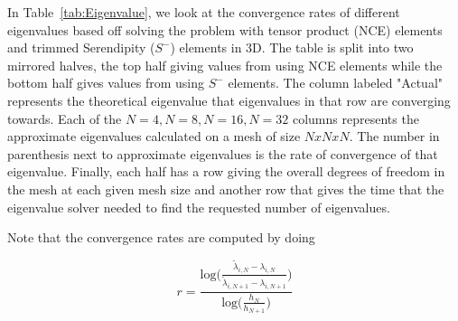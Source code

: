 \documentclass[manuscript,screen]{acmart}
\newcommand{\akg}[1]{\textcolor{blue}{\textbf{AG:} #1}}
\begin{document}

\noindent In Table~\ref{tab:Eigenvalue}, we look at the convergence rates of different eigenvalues based off solving the problem with tensor product (NCE) elements and trimmed Serendipity ($S^-$) elements in 3D.  The table is split into two mirrored halves, the top half giving values from using NCE elements while the bottom half gives values from using $S^-$ elements.  The column labeled "Actual" represents the theoretical eigenvalue that eigenvalues in that row are converging towards.  Each of the $N=4, N=8, N=16, N=32$ columns represents the approximate eigenvalues calculated on a mesh of size $N x N x N$.  The number in parenthesis next to approximate eigenvalues is the rate of convergence of that eigenvalue.  Finally, each half has a row giving the overall degrees of freedom in the mesh at each given mesh size and another row that gives the time that the eigenvalue solver needed to find the requested number of eigenvalues.


\noindent Note that the convergence rates are computed by doing

\[r = \frac{\text{log}\bigg(\frac{\tilde{\lambda}_{i,N} - \lambda_{i,N}}{\tilde{\lambda}_{i,N+1} - \lambda_{i,N+1}} \bigg)}{\text{log}\bigg( \frac{h_N}{h_{N+1}} \bigg)} \]
\end{document}
